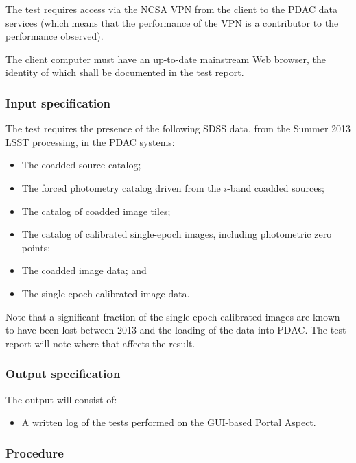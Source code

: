 The test requires access via the NCSA VPN from the client to the PDAC data services 
(which means that the performance of the VPN is a contributor to the performance observed).

The client computer must have an up-to-date mainstream Web browser, the identity of which shall be documented in the test report.


\subsubsection{Input specification}

The test requires the presence of the following SDSS data, from the Summer 2013 LSST processing, in the PDAC systems:

\begin{itemize}

  \item{The coadded source catalog;}
  \item{The forced photometry catalog driven from the $i$-band coadded sources;}
  \item{The catalog of coadded image tiles;}
  \item{The catalog of calibrated single-epoch images, including photometric zero points;}
  \item{The coadded image data; and}
  \item{The single-epoch calibrated image data.}
\end{itemize}

Note that a significant fraction of the single-epoch calibrated images are known to have been lost between 2013 and the loading of the data into PDAC.
The test report will note where that affects the result.

\subsubsection{Output specification}

The output will consist of:

\begin{itemize}
  \item{A written log of the tests performed on the GUI-based Portal Aspect.}
\end{itemize}


\subsubsection{Procedure}


